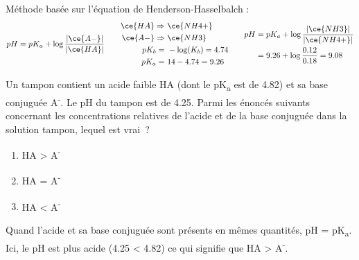 \documentclass[
  11pt,
  a4paper,
  openany]{book}
\providecommand{\tightlist}{%
  \setlength{\itemsep}{0pt}\setlength{\parskip}{0pt}}
\begin{document}
\begin{Answer}
Méthode basée sur l'équation de Henderson-Hasselbalch :
\[
\begin{split}
  pH = pK_a + \log \frac{|\ce{A-}|}{|\ce{HA}|}
\end{split}
\qquad
\begin{split}
  \ce{HA} \Rightarrow &\ \ce{NH4+} \\
  \ce{A-} \Rightarrow &\ \ce{NH3} \\
  pK_b = &\ -\log(K_b) = 4.74 \\
  pK_a = &\ 14 - 4.74 = 9.26
\end{split}
\qquad
\begin{split}
  pH &= pK_a + \log \frac{|\ce{NH3}|}{|\ce{NH4+}|} \\
  &= 9.26 + \log \frac{0.12}{0.18} = 9.08 \\
\end{split}
\]

\end{Answer}

\begin{Exercise}

Un tampon contient un acide faible HA (dont le pK\textsubscript{a} est de 4.82) et sa base conjuguée A\textsuperscript{-}. Le pH du tampon est de 4.25. Parmi les énoncés suivants concernant les concentrations relatives de l'acide et de la base conjuguée dans la solution tampon, lequel est vrai~?

\begin{enumerate}
\def\labelenumi{\alph{enumi}.}
\tightlist
\item
  \textbar HA\textbar{} \textgreater{} \textbar A\textsuperscript{-}\textbar{}
\item
  \textbar HA\textbar{} = \textbar A\textsuperscript{-}\textbar{}
\item
  \textbar HA\textbar{} \textless{} \textbar A\textsuperscript{-}\textbar{}
\end{enumerate}

\end{Exercise}

\begin{Answer}
Quand l'acide et sa base conjuguée sont présents en mêmes quantités, pH = pK\textsubscript{a}. Ici, le pH est plus acide (4.25 \textless{} 4.82) ce qui signifie que \textbar HA\textbar{} \textgreater{} \textbar A\textsuperscript{-}\textbar.

\end{Answer}

\clearpage
\end{document}
